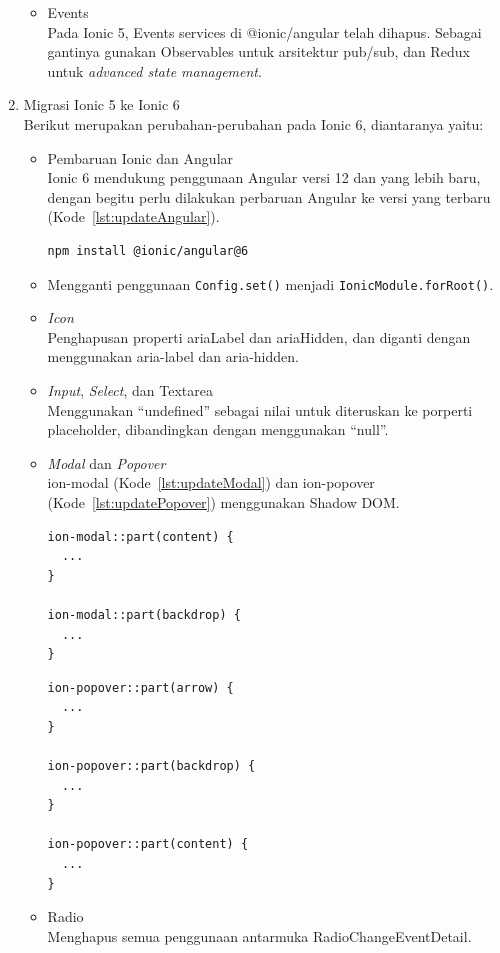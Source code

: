 \begin{enumerate}
\begin{itemize}
		\item Events \\
		Pada Ionic 5, Events services di @ionic/angular telah dihapus. Sebagai gantinya gunakan Observables untuk arsitektur pub/sub, dan Redux untuk {\it advanced state management}. 
	\end{itemize}
	\item Migrasi Ionic 5 ke Ionic 6 \\
	Berikut merupakan perubahan-perubahan pada Ionic 6, diantaranya yaitu:
	\begin{itemize}
		\item Pembaruan Ionic dan Angular \\
		Ionic 6 mendukung penggunaan Angular versi 12 dan yang lebih baru, dengan begitu perlu dilakukan perbaruan Angular ke versi yang terbaru (Kode~\ref{lst:updateAngular}).
		
\begin{lstlisting}[label={lst:updateAngular}, caption=Kode untuk Memperbarui Versi Ionic 6 dengan versi Angular Terbaru]
npm install @ionic/angular@6
\end{lstlisting} 

		\item Mengganti penggunaan \texttt{Config.set()} menjadi \texttt{IonicModule.forRoot()}.

		\item \textit{Icon} \\
		Penghapusan properti ariaLabel dan ariaHidden, dan diganti dengan menggunakan aria-label dan aria-hidden.
		\item \textit{Input}, \textit{Select}, dan Textarea \\
		Menggunakan ``undefined'' sebagai nilai untuk diteruskan ke porperti placeholder, dibandingkan dengan menggunakan ``null''.	
		
		\item \textit{Modal} dan \textit{Popover} \\
		ion-modal (Kode~\ref{lst:updateModal}) dan ion-popover (Kode~\ref{lst:updatePopover}) menggunakan Shadow DOM.
		
\begin{lstlisting}[label={lst:updateModal}, caption=Kode ion-modal menggunakan Shadow DOM pada CSS]
ion-modal::part(content) {
  ...
}

ion-modal::part(backdrop) {
  ...
}
\end{lstlisting} 

\begin{lstlisting}[label={lst:updatePopover}, caption=Kode ion-popover menggunakan Shadow DOM pada CSS]
ion-popover::part(arrow) {
  ...
}

ion-popover::part(backdrop) {
  ...
}

ion-popover::part(content) {
  ...
}
\end{lstlisting} 

		\item Radio \\
		Menghapus semua penggunaan antarmuka RadioChangeEventDetail.
		
	\end{itemize}
\end{enumerate}



